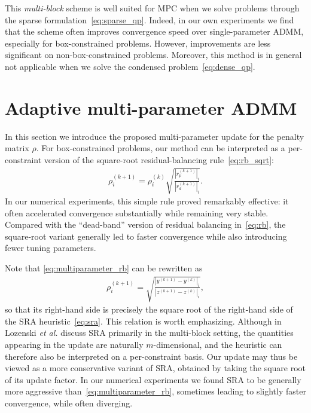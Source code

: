\documentclass[letterpaper, 10 pt, conference]{ieeeconf}  %
\begin{document}
This \textit{multi-block} scheme is well suited for MPC  when we solve problems through the sparse formulation~\eqref{eq:sparse_qp}. Indeed, in our own experiments we find that the scheme often improves convergence speed over single-parameter ADMM, especially for box-constrained problems. However, improvements are less significant on non-box-constrained problems. Moreover, this method is in general not applicable when we solve the condensed problem~\eqref{eq:dense_qp}.

\section{Adaptive multi-parameter ADMM} \label{sec:amp-admm}

In this section we introduce the proposed multi-parameter update for the penalty matrix $\rho$. For box-constrained problems,
our method can be interpreted as a per-constraint version of the square-root residual-balancing rule~\eqref{eq:rb_sqrt}:
\begin{equation}
\label{eq:multiparameter_rb}
\begin{aligned}
\rho_i^{(k+1)} = \rho_i^{(k)} \sqrt{\frac{|r_p^{(k+1)}|_i}{|r_d^{(k+1)}|_i}} .
\end{aligned}
\end{equation}
In our numerical experiments, this simple rule proved remarkably effective: it often accelerated convergence substantially while remaining very stable. Compared with the ``dead-band'' version of residual balancing in~\eqref{eq:rb}, the square-root variant generally led to faster convergence while also introducing fewer tuning parameters.

Note that \eqref{eq:multiparameter_rb} can be rewritten as
\begin{align*}
    \rho_i^{(k+1)} = \sqrt{\frac{|y^{(k+1)}-y^{(k)}|_i}{|z^{(k+1)}-z^{(k)}|_i}},
\end{align*}
so that its right-hand side is precisely the square root of the right-hand side of the SRA heuristic~\eqref{eq:sra}. This relation is worth emphasizing. Although in~\cite{multiblock_admm} Lozenski \emph{et al.} discuss SRA primarily in the multi-block setting, the quantities appearing in the update are naturally $m$-dimensional, and the heuristic can therefore also be interpreted on a per-constraint basis. Our update may thus be viewed as a more conservative variant of SRA, obtained by taking the square root of its update factor. 
In our numerical experiments we found SRA to be generally more aggressive than~\eqref{eq:multiparameter_rb}, sometimes leading to slightly faster convergence, while often diverging.
\end{document}
